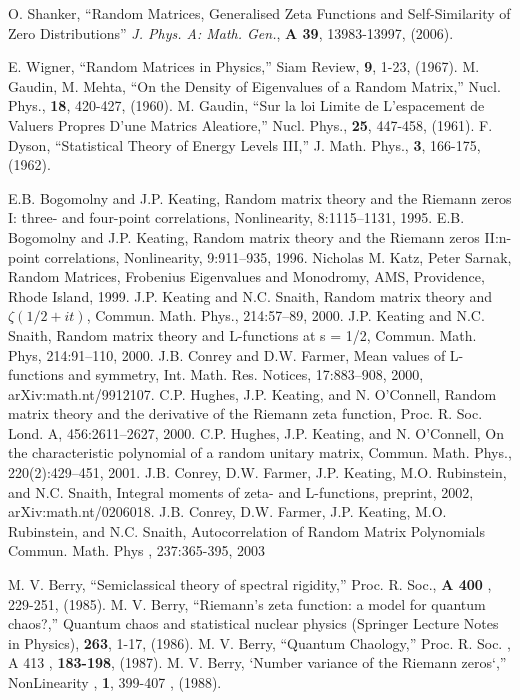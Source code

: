 \documentclass[twoside]{article}
\begin{document}

\begin{thebibliography}{10}

 O. Shanker, 
``Random Matrices, Generalised Zeta Functions and Self-Similarity of Zero Distributions''
{\it J. Phys. A: Math. Gen.}, {\bf A 39}, 13983-13997, (2006). 

 E. Wigner, “Random Matrices in Physics,” Siam Review, {\bf 9}, 1-23, (1967).
 M. Gaudin, M. Mehta, “On the Density of Eigenvalues of a Random Matrix,” 
Nucl. Phys., {\bf 18},
420-427, (1960).
 M. Gaudin, 
“Sur la loi Limite de L’espacement de Valuers Propres D’une Matrics Aleatiore,” 
Nucl. Phys., {\bf 25}, 447-458, (1961).
 F. Dyson, “Statistical Theory of Energy Levels III,” 
J. Math. Phys., {\bf 3}, 166-175, (1962).

 E.B. Bogomolny and J.P. Keating, Random matrix theory and the Riemann zeros I: three- and
four-point correlations, Nonlinearity, 8:1115–1131, 1995.
 E.B. Bogomolny and J.P. Keating, Random matrix theory and the Riemann zeros II:n-point
correlations, Nonlinearity, 9:911–935, 1996.
 Nicholas M. Katz, Peter Sarnak, Random Matrices, Frobenius Eigenvalues and Monodromy, AMS,
Providence, Rhode Island, 1999.
 J.P. Keating and N.C. Snaith, Random matrix theory and $\zeta(1/2 + it)$, Commun. Math. Phys.,
214:57–89, 2000.
 J.P. Keating and N.C. Snaith, Random matrix theory and L-functions at s = 1/2, Commun.
Math. Phys, 214:91–110, 2000.
 J.B. Conrey and D.W. Farmer, Mean values of L-functions and symmetry, Int. Math. Res.
Notices, 17:883–908, 2000, arXiv:math.nt/9912107.
 C.P. Hughes, J.P. Keating, and N. O’Connell, Random matrix theory and the derivative of the
Riemann zeta function, Proc. R. Soc. Lond. A, 456:2611–2627, 2000.
 C.P. Hughes, J.P. Keating, and N. O’Connell, On the characteristic polynomial of a random
unitary matrix, Commun. Math. Phys., 220(2):429–451, 2001.
 J.B. Conrey, D.W. Farmer, J.P. Keating, M.O. Rubinstein, and N.C. Snaith, Integral moments
of zeta- and L-functions, preprint, 2002, arXiv:math.nt/0206018.
 J.B. Conrey, D.W. Farmer, J.P. Keating, M.O. Rubinstein, and N.C. Snaith, Autocorrelation of
Random Matrix Polynomials Commun. Math. Phys , 237:365-395, 2003

  M. V. Berry, “Semiclassical theory of spectral rigidity,” 
Proc. R. Soc., {\bf A 400} , 229-251, (1985). 
  M. V. Berry, “Riemann’s zeta function: a model for quantum chaos?,” 
Quantum chaos and
statistical nuclear physics (Springer Lecture Notes in Physics), {\bf 263}, 1-17, (1986).
  M. V. Berry, “Quantum Chaology,” 
Proc. R. Soc. , A 413 , {\bf 183-198}, (1987).
  M. V. Berry, ‘Number variance of the Riemann zeros‘,”
 NonLinearity , {\bf 1}, 399-407 , (1988).


\end{thebibliography}
\end{document}
